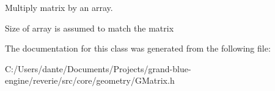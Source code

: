Multiply matrix by an array. 

Size of array is assumed to match the matrix 

The documentation for this class was generated from the following file\+:\begin{DoxyCompactItemize}
\item 
C\+:/\+Users/dante/\+Documents/\+Projects/grand-\/blue-\/engine/reverie/src/core/geometry/G\+Matrix.\+h\end{DoxyCompactItemize}
